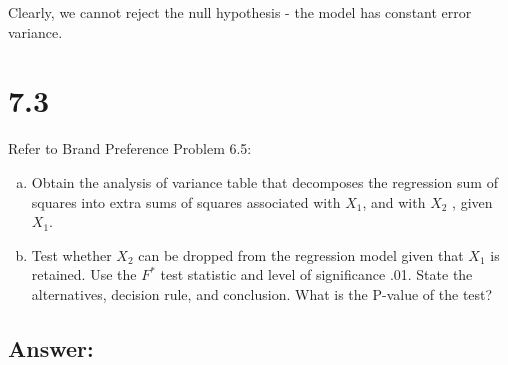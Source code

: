 \documentclass{article}
\begin{document}
\begin{enumerate}[a)]
Clearly, we cannot reject the null hypothesis - the model has constant error variance.

\end{enumerate}

\section{7.3}

Refer to Brand Preference Problem 6.5:

\begin{enumerate}[a)]
\item{} Obtain the analysis of variance table that decomposes the regression sum of squares into extra sums of squares associated with $X_1$, and with $X_2$ , given $X_1$.
\item{} Test whether $X_2$ can be dropped from the regression model given that $X_1$ is retained. Use the $F^*$ test statistic and level of significance .01. State the alternatives, decision rule, and conclusion. What is the P-value of the test?
\end{enumerate}

\subsection{Answer:}
\end{document}
